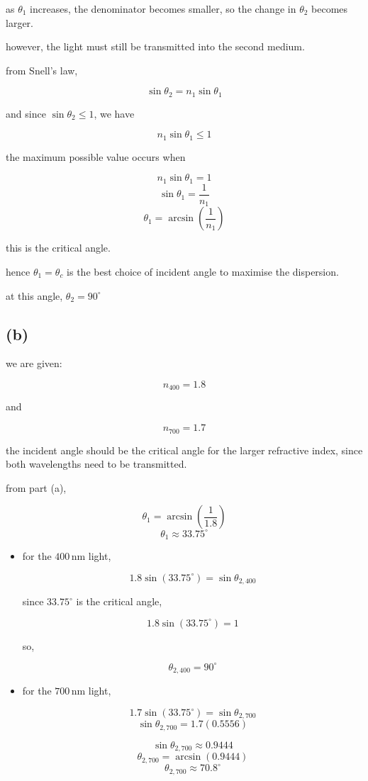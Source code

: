 \documentclass{article}
\begin{document}
as $\theta_1$ increases, the denominator becomes smaller, so the change in $\theta_2$ becomes larger.

however, the light must still be transmitted into the second medium.

from Snell's law,

\[
\sin\theta_2=n_1\sin\theta_1
\]

and since $\sin\theta_2\leq1$, we have

\[
n_1\sin\theta_1\leq1
\]

the maximum possible value occurs when

\[
n_1\sin\theta_1=1
\]
\[
\sin\theta_1=\frac{1}{n_1}
\]
\[
\theta_1=\arcsin\left(\frac{1}{n_1}\right)
\]

this is the critical angle.

hence $\boxed{\theta_1=\theta_c}$ is the best choice of incident angle to maximise the dispersion.

at this angle, $\theta_2=90^\circ$

\subsection*{(b)}

we are given:

\[
n_{400}=1.8
\]

and

\[
n_{700}=1.7
\]

the incident angle should be the critical angle for the larger refractive index, since both wavelengths need to be transmitted.

from part (a),

\[
\theta_1 = \arcsin\left(\frac{1}{1.8}\right)
\]
\[
\theta_1\approx33.75^\circ
\]

\begin{itemize}
    \item for the $400\,\mathrm{nm}$ light,

\[
1.8\sin(33.75^\circ)=\sin\theta_{2,400}
\]

since $33.75^\circ$ is the critical angle,

\[
1.8\sin(33.75^\circ)=1
\]

so,

\[
\theta_{2,400}=90^\circ
\]

\item for the $700\,\mathrm{nm}$ light,

\[
1.7\sin(33.75^\circ)=\sin\theta_{2,700}
\]
\[
\sin\theta_{2,700}
=
1.7(0.5556)
\]

\[
\sin\theta_{2,700}\approx0.9444
\]
\[
\theta_{2,700}=\arcsin(0.9444)
\]
\[
\theta_{2,700}\approx70.8^\circ
\]
\end{itemize}
\end{document}
